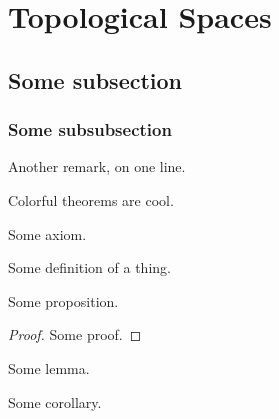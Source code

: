 \documentclass[14pt,oneside]{extarticle}
\begin{document}
\section{Topological Spaces}
\subsection{Some subsection}
\subsubsection{Some subsubsection}

 
 Another remark, on one line.

\begin{theorem*}\label{thm:1}
  Colorful theorems are cool.
\end{theorem*}

\begin{axiom}
  Some axiom.
\end{axiom}


\begin{definition*}
  Some definition of a thing.\footnotemark
\end{definition*}

\begin{proposition*}
  Some proposition.
  \begin{proof}
    Some proof.
  \end{proof}
\end{proposition*}

\begin{lemma}
  Some lemma.
\end{lemma}

\begin{corollary*}
  Some corollary.
\end{corollary*}
\end{document}
